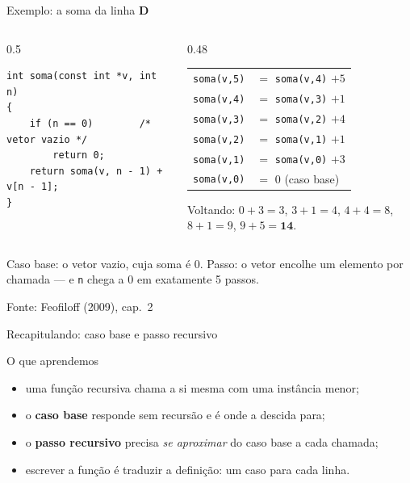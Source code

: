 \documentclass[aspectratio=169]{beamer}
\newcommand{\fonte}[1]{\vfill\hfill{\scriptsize\textcolor{UFSGray}{Fonte: #1}}}
\begin{document}
\begin{frame}[fragile]{Exemplo: a soma da linha \textbf{D}}
  \begin{columns}[c]
    \begin{column}{0.5\textwidth}
\begin{lstlisting}[style=tinyC]
int soma(const int *v, int n)
{
    if (n == 0)        /* vetor vazio */
        return 0;
    return soma(v, n - 1) + v[n - 1];
}
\end{lstlisting}
    \end{column}
    \begin{column}{0.48\textwidth}
      \scriptsize
      \begin{tabular}{@{}l@{\ }l@{}}
        \texttt{soma(v,5)} & $=$ \texttt{soma(v,4)} $+ 5$\\
        \texttt{soma(v,4)} & $=$ \texttt{soma(v,3)} $+ 1$\\
        \texttt{soma(v,3)} & $=$ \texttt{soma(v,2)} $+ 4$\\
        \texttt{soma(v,2)} & $=$ \texttt{soma(v,1)} $+ 1$\\
        \texttt{soma(v,1)} & $=$ \texttt{soma(v,0)} $+ 3$\\
        \texttt{soma(v,0)} & $=$ \textcolor{UFSRed}{$0$ \quad (caso base)}
      \end{tabular}

      \medskip
      Voltando: $0+3=3$, $3+1=4$, $4+4=8$, $8+1=9$, $9+5=\mathbf{14}$.
    \end{column}
  \end{columns}
  \begin{block}{}
    \small Caso base: o vetor vazio, cuja soma é 0. Passo: o vetor encolhe
    um elemento por chamada --- e \texttt{n} chega a 0 em exatamente 5
    passos.
  \end{block}
  \fonte{Feofiloff (2009), cap.~2~\cite{feofiloff2009algoritmos}}
\end{frame}

\begin{frame}{Recapitulando: caso base e passo recursivo}
  \begin{block}{O que aprendemos}
    \begin{itemize}
      \item uma função recursiva chama a si mesma com uma instância menor;
      \item o \textbf{caso base} responde sem recursão e é onde a descida
        para;
      \item o \textbf{passo recursivo} precisa \emph{se aproximar} do caso
        base a cada chamada;
      \item escrever a função é traduzir a definição: um caso para cada linha.
    \end{itemize}
  \end{block}
\end{frame}
\end{document}
